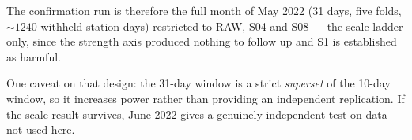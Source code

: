 The confirmation run is therefore the full month of May 2022 (31 days, five
folds, ${\sim}1240$ withheld station-days) restricted to RAW, S04 and S08 ---
the scale ladder only, since the strength axis produced nothing to follow up
and S1 is established as harmful.

One caveat on that design: the 31-day window is a strict \emph{superset} of the
10-day window, so it increases power rather than providing an independent
replication. If the scale result survives, June 2022 gives a genuinely
independent test on data not used here.
